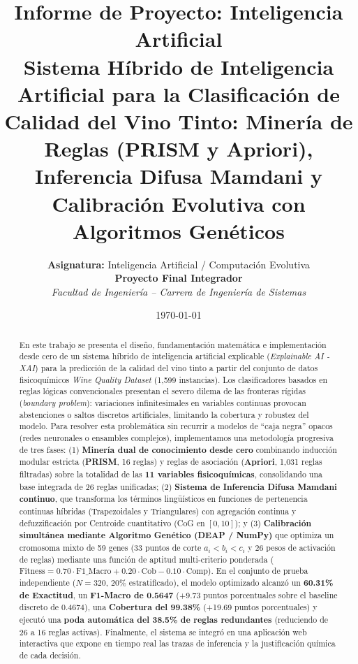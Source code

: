 \documentclass[11pt,a4paper]{article}
\title{
    \vspace{-1.5cm}
    \textbf{Informe de Proyecto: Inteligencia Artificial} \\[0.3cm]
    \Large \textbf{Sistema Híbrido de Inteligencia Artificial para la Clasificación de Calidad del Vino Tinto: Minería de Reglas (PRISM y Apriori), Inferencia Difusa Mamdani y Calibración Evolutiva con Algoritmos Genéticos}
}
\author{
    \textbf{Asignatura:} Inteligencia Artificial / Computación Evolutiva \\[0.1cm]
    \textbf{Proyecto Final Integrador} \\[0.1cm]
    \textit{Facultad de Ingeniería -- Carrera de Ingeniería de Sistemas}
}
\date{\today}
\begin{document}
\maketitle

\begin{abstract}
En este trabajo se presenta el diseño, fundamentación matemática e implementación desde cero de un sistema híbrido de inteligencia artificial explicable (\textit{Explainable AI - XAI}) para la predicción de la calidad del vino tinto a partir del conjunto de datos fisicoquímicos \textit{Wine Quality Dataset} (1,599 instancias). Los clasificadores basados en reglas lógicas convencionales presentan el severo dilema de las fronteras rígidas (\textit{boundary problem}): variaciones infinitesimales en variables continuas provocan abstenciones o saltos discretos artificiales, limitando la cobertura y robustez del modelo. Para resolver esta problemática sin recurrir a modelos de ``caja negra'' opacos (redes neuronales o ensambles complejos), implementamos una metodología progresiva de tres fases: (1) \textbf{Minería dual de conocimiento desde cero} combinando inducción modular estricta (\textbf{PRISM}, 16 reglas) y reglas de asociación (\textbf{Apriori}, 1,031 reglas filtradas) sobre la totalidad de las \textbf{11 variables fisicoquímicas}, consolidando una base integrada de 26 reglas unificadas; (2) \textbf{Sistema de Inferencia Difusa Mamdani continuo}, que transforma los términos lingüísticos en funciones de pertenencia continuas híbridas (Trapezoidales y Triangulares) con agregación continua y defuzzificación por Centroide cuantitativo (CoG en $[0, 10]$); y (3) \textbf{Calibración simultánea mediante Algoritmo Genético (DEAP / NumPy)} que optimiza un cromosoma mixto de 59 genes (33 puntos de corte $a_i < b_i < c_i$ y 26 pesos de activación de reglas) mediante una función de aptitud multi-criterio ponderada ($\text{Fitness} = 0.70\cdot\text{F1\_Macro} + 0.20\cdot\text{Cob} - 0.10\cdot\text{Comp}$). En el conjunto de prueba independiente ($N=320$, 20\% estratificado), el modelo optimizado alcanzó un \textbf{60.31\% de Exactitud}, un \textbf{F1-Macro de 0.5647} (+9.73 puntos porcentuales sobre el baseline discreto de 0.4674), una \textbf{Cobertura del 99.38\%} (+19.69 puntos porcentuales) y ejecutó una \textbf{poda automática del 38.5\% de reglas redundantes} (reduciendo de 26 a 16 reglas activas). Finalmente, el sistema se integró en una aplicación web interactiva que expone en tiempo real las trazas de inferencia y la justificación química de cada decisión.
\end{abstract}
\end{document}
